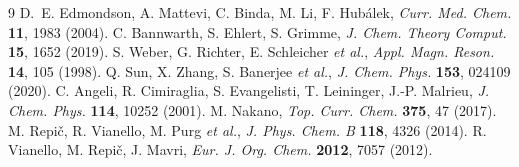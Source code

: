 \documentclass[11pt]{article}
\begin{document}
\begin{thebibliography}{9}
\footnotesize
{} D.~E. Edmondson, A. Mattevi, C. Binda, M. Li, F. Hub\'{a}lek, \textit{Curr. Med. Chem.} \textbf{11}, 1983 (2004).
 C. Bannwarth, S. Ehlert, S. Grimme, \textit{J. Chem. Theory Comput.} \textbf{15}, 1652 (2019).
 S. Weber, G. Richter, E. Schleicher \textit{et al.}, \textit{Appl. Magn. Reson.} \textbf{14}, 105 (1998).
 Q. Sun, X. Zhang, S. Banerjee \textit{et al.}, \textit{J. Chem. Phys.} \textbf{153}, 024109 (2020).
 C. Angeli, R. Cimiraglia, S. Evangelisti, T. Leininger, J.-P. Malrieu, \textit{J. Chem. Phys.} \textbf{114}, 10252 (2001).
 M. Nakano, \textit{Top. Curr. Chem.} \textbf{375}, 47 (2017).
 M. Repi\v{c}, R. Vianello, M. Purg \textit{et al.}, \textit{J. Phys. Chem. B} \textbf{118}, 4326 (2014).
 R. Vianello, M. Repi\v{c}, J. Mavri, \textit{Eur. J. Org. Chem.} \textbf{2012}, 7057 (2012).
\end{thebibliography}
\end{document}
